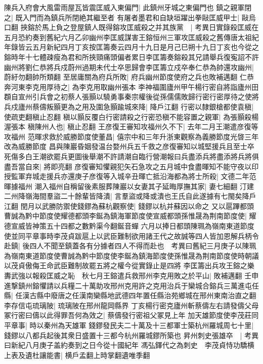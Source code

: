 陳兵入府會大風雷雨屋瓦皆震匡威入東偏門|{
	此鎮州牙城之東偏門也}
鎮之親軍閉之|{
	既入門而為鎮兵所閉絶其繼至者}
有屠者墨君和自缺垣躍出拳敺匡威甲士|{
	敺烏口翻}
挾鎔於馬上負之登屋鎮人既得鎔攻匡威殺之并其族黨　|{
	考異日實錄殺匡威在五月恐約奏到舊紀六月乙卯幽州李匡威謀害王鎔恒州三軍攻匡威殺之舊傳唐太祖紀年錄皆云五月新紀四月丁亥按匡籌奏云四月十九日是月己巳朔十九日丁亥也今從之}
鎔時年十七體疎瘦為君和所挾頸痛頭偏者累日李匡籌奏鎔殺其兄請舉兵復寃詔不許幽州將劉仁恭將兵戍蔚州過期未代士卒思歸會李匡籌立戍卒奉仁恭為帥還攻幽州|{
	蔚紆勿翻帥所類翻}
至居庸關為府兵所敗|{
	府兵幽州節度使府之兵也敗補邁翻}
仁恭奔河東李克用厚待之|{
	為李克用取幽州張本}
李神福圍廬州甲午楊行密自將詣廬州田頵自宣州引兵會之初蔡人張顥以驍勇事秦宗權後從孫儒儒敗歸行密行密厚待之使將兵戍廬州蔡儔叛顥更為之用及圍急顥踰城來降|{
	降戶江翻}
行密以隸銀槍都使袁稹|{
	使疏吏翻稹止忍翻}
稹以顥反覆白行密請殺之行密恐稹不能容置之親軍|{
	為張顥殺楊渥張本}
稹陳州人也|{
	稹止忍翻}
王彦復王審知攻福州久不下|{
	去年二月王潮遣彦復等攻福州}
范暉求救於威勝節度使董昌|{
	僖宗中和三年升浙東觀察為義勝節度光晵三年改為威勝節度}
昌與陳巖昏姻發温台婺州兵五千救之彦復審知以城堅援兵且至士卒死傷多白王潮欲罷兵更圖後舉潮不許請潮自臨行營潮報曰兵盡添兵將盡添將兵將俱盡吾當自來|{
	將即亮翻}
彦復審知懼親犯矢石急攻之五月城中食盡暉知不能守夜以印授監軍弃城走援兵亦還庚子彦復等入城辛丑暉亡抵沿海都為將士所殺|{
	文德二年范暉據福州}
潮入福州自稱留後素服葬陳巖以女妻其子延晦厚撫其家|{
	妻七細翻}
汀建二州降嶺海間羣盜二十餘輩皆降潰|{
	言羣盜或降或潰也王氏自此遂據有七閩矣降戶江翻}
閏月以武勝防禦使錢鏐為蘇杭觀察使|{
	錢鏐以杭并蘇因以命之}
又以扈蹕都頭曹誠為黔中節度使耀德都頭李鋋為鎮海軍節度使宣威都頭孫惟晟為荆南節度使|{
	耀德宣威皆神策五十四都之數黔渠今翻鋋音蟬}
六月以捧日都頭陳珮為嶺南東道節度使並同平章事時李茂貞跋扈上以武臣難制欲用諸王代之故誠等四人皆加恩解兵柄令赴鎮|{
	後四人不聞至鎮蓋各有分據者四人不得而赴也　考異曰舊紀三月庚子以陳珮為嶺南東道節度使曹誠為黔中節度使李鋋為鎮海節度使孫惟晟為荆南節度使時朝議以茂貞傲侮王命武臣難制故罷五將之權今從實錄止是四將}
李匡籌出兵攻王鎔之樂夀武強以報殺匡威之恥　秋七月王鎔遣兵救邢州李克用敗之於平山|{
	敗補邁翻}
壬申進撃鎮州鎔懼請以兵糧二十萬助攻邢州克用許之克用治兵于欒城合鎔兵三萬進屯任縣|{
	任漢古縣中廢唐之任漢南欒縣地武德四年置任縣治苑鄉城在邢州東南治直之翻}
李存信屯琉璃陂|{
	琉璃陂在邢州龍岡縣界}
丁亥楊行密克廬州斬蔡儔左右請發儔父母冢行密曰儔以此得罪吾何為效之|{
	蔡儔發行密祖父冢見上年}
加天雄節度使李茂莊同平章事|{
	時以秦州為天雄軍}
錢鏐發民夫二十萬及十三都軍士築杭州羅城周七十里|{
	錢鏐以八都兵起後其衆日盛置十三都今杭州羅城鏐所築也}
昇州刺史張雄卒　|{
	考異曰新紀八月庚子盖約奏到之日今從十國紀年}
馮弘鐸代之為刺史　李茂貞恃功驕横上表及遺杜讓能書|{
	横戶孟翻上時掌翻遺唯季翻}
